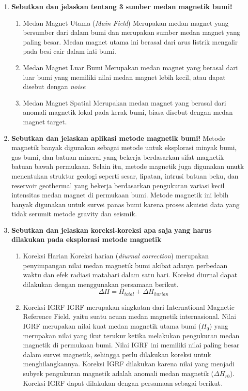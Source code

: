 \documentclass{article}
\begin{document}
\begin{enumerate}
    \item \textbf{Sebutkan dan jelaskan tentang 3 sumber medan magnetik bumi!}
    \begin{enumerate}[label=\alph*.]
        \item Medan Magnet Utama (\textit{Main Field})
        \subitem Merupakan medan magnet yang bersumber dari dalam bumi dan merupakan sumber medan magnet yang paling besar. Medan magnet utama ini berasal dari arus listrik mengalir pada besi cair dalam inti bumi.
        \item Medan Magnet Luar Bumi
        \subitem Merupakan medan magnet yang berasal dari luar bumi yang memiliki nilai medan magnet lebih kecil, atau dapat disebut dengan \textit{noise}
        \item Medan Magnet Spatial
        \subitem Merupakan medan magnet yang berasal dari anomali magnetik lokal pada kerak bumi, biasa disebut dengan medan magnet target.
        \end{enumerate}
    \item \textbf{Sebutkan dan jelaskan aplikasi metode magnetik bumi!}
    \subitem Metode magnetik banyak digunakan sebagai metode untuk eksplorasi minyak bumi, gas bumi, dan batuan mineral yang bekerja berdasarkan sifat magnetik batuan bawah permukaan. Selain itu, metode magnetik juga digunakan unutk menentukan struktur geologi seperti sesar, lipatan, intrusi batuan beku, dan reservoir geothermal yang bekerja berdasarkan pengukuran variasi kecil intensitas medan magnet di permukaan bumi. Metode magnetik ini lebih banyak digunakan untuk survei panas bumi karena proses akuisisi data yang tidak serumit metode gravity dan seismik.
    \item \textbf{Sebutkan dan jelaskan koreksi-koreksi apa saja yang harus dilakukan pada eksplorasi metode magnetik}
    \begin{enumerate}[label=\alph*.]
        \item Koreksi Harian
        \subitem Koreksi harian (\textit{diurnal correction}) merupakan penyimpangan nilai medan magnetik bumi akibat adanya perbedaan waktu dan efek radiasi matahari dalam satu hari. Koreksi diurnal dapat dilakukan dengan menggunakan persamaan berikut.
        \[\Delta H = H_{total} \pm \Delta H_{harian}\]
        \item Koreksi IGRF
        \subitem IGRF merupakan singkatan dari International Magnetic Reference Field, yaitu suatu acuan medan magnetik internasional. Nilai IGRF merupakan nilai kuat medan magnetik utama bumi (\(H_0\)) yang merupakan nilai yang ikut terukur ketika melakukan pengukuran medan magnetik di permukaan bumi. Nilai IGRF ini memiliki nilai paling besar dalam survei magnetik, sehingga perlu dilakukan koreksi untuk menghilangkannya. Koreksi IGRF dilakukan karena nilai yang menjadi subyek pengukuran magnetik adalah anomali medan magnetik (\(\Delta H_{r0}\)). Koreksi IGRF dapat dilakukan dengan persamaan sebagai berikut.

\end{enumerate}
\end{enumerate}
\end{document}
